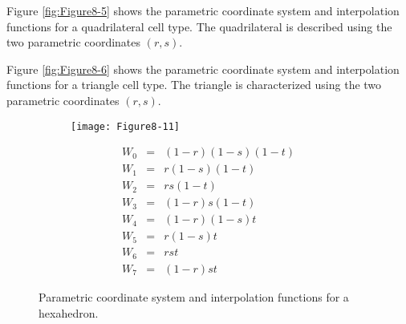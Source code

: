 \begin{description}[leftmargin=0cm,labelindent=0cm]
    \item[Quadrilateral.\index{interpolation function!quadrilateral}] Figure \ref{fig:Figure8-5} shows the parametric coordinate system and interpolation functions for a quadrilateral cell type. The quadrilateral is described using the two parametric coordinates $(r,s)$.

    \item[Triangle.\index{interpolation function!triangle}] Figure \ref{fig:Figure8-6} shows the parametric coordinate system and interpolation functions for a triangle cell type. The triangle is characterized using the two parametric coordinates $(r,s)$.


    \begin{figure}[!htb]
        \centering
        \begin{subfigure}{0.48\linewidth}
            \centering
            \texttt{[image: Figure8-11]}
            \caption*{}
        \end{subfigure}
        \hfill
        \begin{subfigure}{0.48\linewidth}
            \centering
            \begin{equation*}
            \begin{array}{lll}
            W_0 &=& (1 - r)(1 - s)(1 - t) \\
            W_1 &=& r (1-s)(1 -t) \\
            W_2 &=& rs (1-t) \\
            W_3 &=& (1-r)s(1 - t) \\
            W_4 &=& (1 - r)(1 - s) t \\
            W_5 &=& r (1-s)t \\
            W_6 &=& rs t \\
            W_7 &=& (1-r)st
            \end{array}
            \end{equation*}
        \end{subfigure}%
        \caption{Parametric coordinate system and interpolation functions for a hexahedron.}
        \label{fig:Figure8-11}
    \end{figure}


\end{description}

